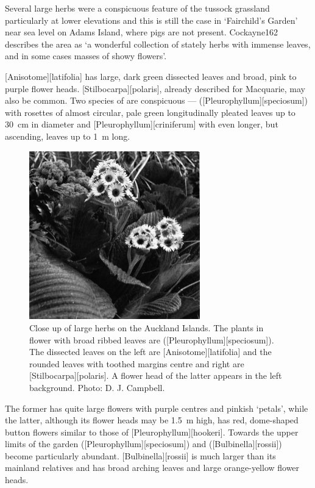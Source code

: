 Several large herbs were a conspicuous feature of the tussock grassland particularly at lower elevations and this is still the case in `Fairchild's Garden' near sea level on Adams Island, where pigs are not present.
Cockayne162 describes the area as `a wonderful collection of stately herbs with immense leaves, and in some cases masses of showy flowers'.

[Anisotome][latifolia] has large, dark green dissected leaves and broad, pink to purple flower heads.
[Stilbocarpa][polaris], already described for Macquarie, may also be common.
Two species of  are conspicuous ---  ([Pleurophyllum][speciosum]) with rosettes of almost circular, pale green longitudinally pleated leaves up to \SI{30}{\centi\metre} in diameter and [Pleurophyllum][criniferum] with even longer, but ascending, leaves up to \SI{1}{\metre} long.
\begin{figure}
	\includegraphics[width=0.66\textwidth]{graphics/figure117herbs.jpg}
	\centering
	\caption[Close up of large herbs on the Auckland Islands]{Close up of large herbs on the Auckland Islands.
	The plants in flower with broad ribbed leaves are  ([Pleurophyllum][speciosum]).
	The dissected leaves on the left are [Anisotome][latifolia] and the rounded leaves with toothed margins centre and right are [Stilbocarpa][polaris].
	A flower head of the latter appears in the left background.
	Photo: D. J. Campbell.}%
	\label{fig:117herbs}
\end{figure}
The former has quite large flowers with purple centres and pinkish `petals', while the latter, although its flower heads may be \SI{1.5}{\metre} high, has red, dome-shaped button flowers similar to those of [Pleurophyllum][hookeri].
Towards the upper limits of the garden  ([Pleurophyllum][speciosum]) and  ([Bulbinella][rossii]) become particularly abundant.
[Bulbinella][rossii] is much larger than its mainland relatives and has broad arching leaves and large orange-yellow flower heads.


